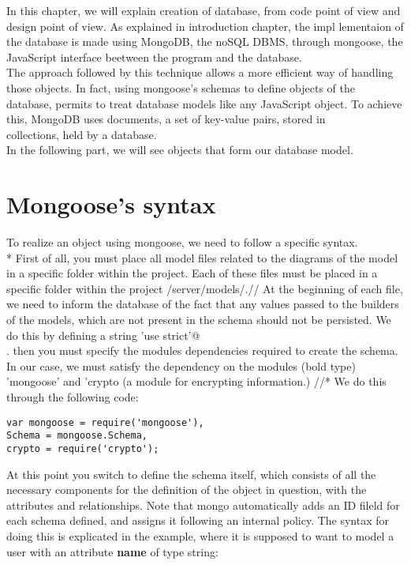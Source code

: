 
In this chapter, we will explain creation of database, from code point of view and design point of view. As explained in introduction chapter, the impl
lementaion of the database is made using MongoDB, the noSQL DBMS, through mongoose, the JavaScript interface beetween the program and the database.
\\
The approach followed by this technique allows a more efficient way of handling those objects. In fact, using mongoose's schemas to define objects of the\\
database, permits to treat database models like any JavaScript object. To achieve this, MongoDB uses documents, a set of key-value pairs, stored in \\
collections, held by a database. 
\\
In the following part, we will see objects that form our database model.

\section{Mongoose's syntax}
To realize an object using mongoose, we need to follow a specific syntax. \\* First of all, you must place all model files related to the diagrams of the model in a specific folder within the project. Each of these files must be placed in a specific folder within the project /server/models/.//
At the beginning of each file, we need to inform the database of the fact that any values ​​passed to the builders of the models, which are not present in the schema should not be persisted. We do this by defining a string \mbox{}\verb@ 'use strict'@\\.
then you must specify the modules dependencies required to create the schema. In our case, we must satisfy the dependency on the modules (bold type) 'mongoose' and 'crypto (a module for encrypting information.) //*   We do this through the following code: 


\begin{lstlisting}      
var mongoose = require('mongoose'),
Schema = mongoose.Schema,
crypto = require('crypto');
\end{lstlisting}

At this point you switch to define the schema itself, which consists of all the necessary components for the definition of the object in question, with the attributes and relationships. Note that mongo automatically adds an ID fileld for each schema defined, and assigns it following an internal policy.
The syntax for doing this is explicated in the example, where it is supposed to want to model a user with an attribute \textbf{name} of type string: 

